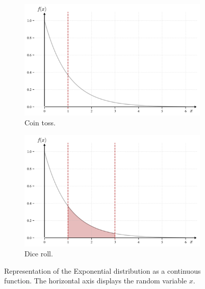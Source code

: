 \documentclass{book}
\begin{document}
\begin{figure}[ht]
    \centering
    \begin{subfigure}[b]{0.48\textwidth}
        \centering
        \includegraphics[width=\textwidth, height=0.7\textwidth]{figures/chapter2/exponential_1.png}
        \caption{Coin toss.}
        \label{fig:exponential1}
    \end{subfigure}
    \hfill
    \begin{subfigure}[b]{0.48\textwidth}
        \centering
        \includegraphics[width=\textwidth, height=0.7\textwidth]{figures/chapter2/exponential_2.png}
        \caption{Dice roll.}
        \label{fig:exponential2}
    \end{subfigure}
    \caption{Representation of the Exponential distribution as a continuous function. The horizontal axis displays the random variable $x$.}
    \label{fig:exponential_comparison}
\end{figure}
\end{document}

